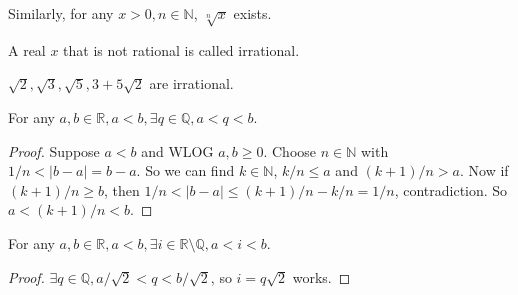 Similarly, for any $x>0,n\in\mathbb N$, $\sqrt[n]{x}$ exists.
\begin{definition}
    A real $x$ that is not rational is called irrational.
\end{definition}
\begin{example}
    $\sqrt 2,\sqrt 3,\sqrt 5,3+5\sqrt 2$ are irrational.
\end{example}
\begin{proposition}
    For any $a,b\in\mathbb R,a<b,\exists q\in\mathbb Q, a<q<b$.
\end{proposition}
\begin{proof}
    Suppose $a<b$ and WLOG $a,b\ge 0$.
    Choose $n\in\mathbb N$ with $1/n<|b-a|=b-a$.
    So we can find $k\in\mathbb N$, $k/n\le a$ and $(k+1)/n>a$.
    Now if $(k+1)/n\ge b$, then $1/n<|b-a|\le (k+1)/n-k/n=1/n$, contradiction.
    So $a<(k+1)/n<b$.
\end{proof}
\begin{corollary}
    For any $a,b\in\mathbb R,a<b,\exists i\in\mathbb R\setminus\mathbb Q, a<i<b$.
\end{corollary}
\begin{proof}
    $\exists q\in\mathbb Q, a/\sqrt 2<q<b/\sqrt 2$, so $i=q\sqrt 2$ works.
\end{proof}
